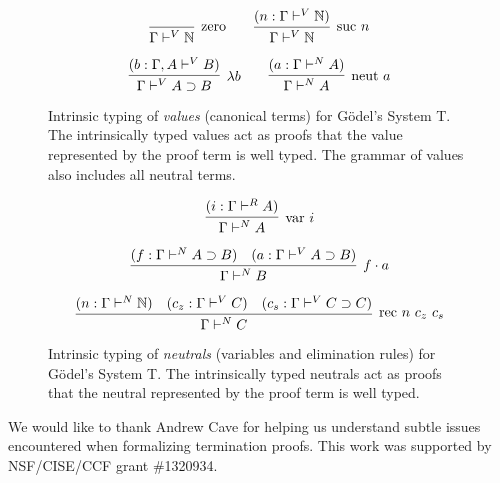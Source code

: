 \documentclass[preprint,nonatbib]{sigplanconf}
\numberwithin{mysubdfn}{mydfn}
\def\arr{\supset}
\def\app{\cdot}
\def\lam{\lambda}
\def\nat{\mathbb{N}}
\newcommand{\con}[1]{\textmd{#1}}
\newcommand{\fun}[1]{\textmd{#1}}
\newcommand{\typv}[1]{\Gamma \vdash^V #1}
\newcommand{\ctypv}[2]{\Gamma , #1 \vdash^V #2}
\newcommand{\typn}[1]{\Gamma \vdash^N #1}
\newcommand{\typr}[1]{\Gamma \vdash^R #1}
\begin{document}
\begin{figure}
\caption{
Intrinsic typing of {\it values} (canonical terms) for G{\"o}del's System T.
The intrinsically typed values act as proofs that the value
represented by the proof term is well typed. The grammar of values
also includes all neutral terms.
}
$$
\infer
  [\con{zero}]
  {\typv{\nat}}
{}
\qquad
\infer
  [\con{suc} ~ n]
  {\typv{\nat}}
{
  (n : \typv{\nat})
}
$$

$$
\infer
  [\lam b]
  {\typv{A \arr B}}
{
  (b : \ctypv{A}{B})
}
\qquad
\infer
  [\fun{neut} ~ a]
  {\typn{A}}
{
  (a : \typn{A})
}
$$
\label{fig:typv}
\end{figure}

\begin{figure}
\caption{
Intrinsic typing of {\it neutrals} (variables and elimination rules) 
for G{\"o}del's System T.
The intrinsically typed neutrals act as proofs that the neutral
represented by the proof term is well typed.
}

$$
\infer
  [\fun{var} ~ i]
  {\typn{A}}
{
  (i : \typr{A})
}
$$

$$
\infer
  [f \app a]
  {\typn{B}}
{
  (f : \typn{A \arr B})
  &
  (a : \typv{A \arr B})
}
$$

$$
\infer
  [\fun{rec} ~ n ~ c_z ~ c_s]
  {\typn{C}}
{
  (n : \typn{\nat})
  &
  (c_z : \typv{C})
  &
  (c_s : \typv{C \arr C})
}
$$
\label{fig:typn}
\end{figure}


\acks

We would like to thank Andrew Cave for helping us understand subtle
issues encountered when formalizing termination proofs.
This work was supported by NSF/CISE/CCF grant \#1320934.



\end{document}
